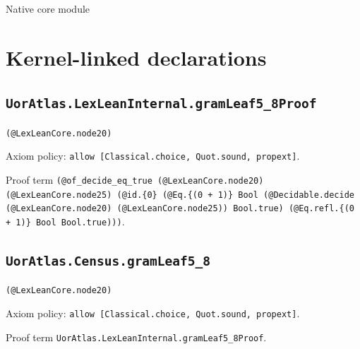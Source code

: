 \documentclass[11pt]{article}
\begin{document}
\begin{center}{\LARGE Native core module}\end{center}
\section*{Kernel-linked declarations}
\subsection*{\texttt{UorAtlas.LexLeanInternal.gramLeaf5\_8Proof}}
\noindent\texttt{(@LexLeanCore.node20)}\par
\noindent Axiom policy: \texttt{allow [Classical.choice, Quot.sound, propext]}.\par
\noindent Proof term \texttt{(@of\_decide\_eq\_true (@LexLeanCore.node20) (@LexLeanCore.node25) (@id.\{0\} (@Eq.\{(0 + 1)\} Bool (@Decidable.decide (@LexLeanCore.node20) (@LexLeanCore.node25)) Bool.true) (@Eq.refl.\{(0 + 1)\} Bool Bool.true)))}.\par
\subsection*{\texttt{UorAtlas.Census.gramLeaf5\_8}}
\noindent\texttt{(@LexLeanCore.node20)}\par
\noindent Axiom policy: \texttt{allow [Classical.choice, Quot.sound, propext]}.\par
\noindent Proof term \texttt{UorAtlas.LexLeanInternal.gramLeaf5\_8Proof}.\par
\end{document}

